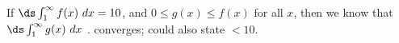 {If $\ds \int_1^\infty f(x)\ dx=10$, and $0\leq g(x)\leq f(x)$ for all $x$, then we know that $\ds \int_1^\infty g(x)\ dx$  \underline{\hskip 1in}.}
{converges; could also state $<10$.}
